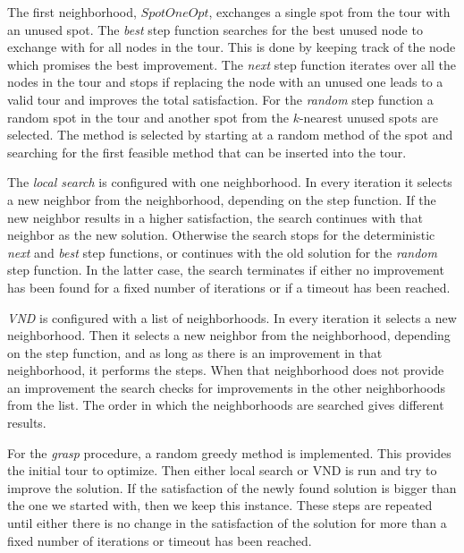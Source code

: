 \documentclass{article}
\begin{document}
The first neighborhood, $SpotOneOpt$, exchanges a single spot from the tour with an unused spot. 
The \emph{best} step function searches for the best unused node to exchange with for all nodes in the tour.
This is done by keeping track of the node which promises the best improvement. %
The \emph{next} step function iterates over all the nodes in the tour and stops if replacing the node with an unused one leads to a valid
tour and improves the total satisfaction. 
For the \emph{random} step function a random spot in the tour and another spot from the $k$-nearest unused spots are selected. 
The method is selected by starting at a random method of the spot and searching for the first feasible method that can be inserted into the
tour.
\medskip

The \emph{local search} is configured with one neighborhood. In every iteration it selects a new neighbor from the neighborhood, depending on the
step function. If the new neighbor results in a higher satisfaction, the search continues with that neighbor as the new solution. Otherwise
the search stops for the deterministic \emph{next} and \emph{best} step functions, or continues with the old solution for the \emph{random}
step function. In the latter case, the search terminates if either no improvement has been found for a fixed number of iterations or if a
timeout has been reached.
\medskip

\emph{VND} is configured with a list of neighborhoods.  In every iteration it selects a new neighborhood. Then it selects a new neighbor from the neighborhood, depending on the step function, and as long as there is an improvement in that neighborhood, it performs the steps. When that neighborhood does not provide an improvement the search checks for improvements in the other neighborhoods from the list. The order in which the neighborhoods are searched gives different results.  

For the \emph{grasp} procedure, a random greedy method is implemented. This provides the initial tour to optimize. Then either local search or VND is run and try to improve the solution. If the satisfaction of the newly found solution is bigger than the one we started with, then we keep this instance. These steps are repeated until either there is no change in the satisfaction of the solution for more than a fixed number of iterations or timeout has been reached.  
\end{document}
